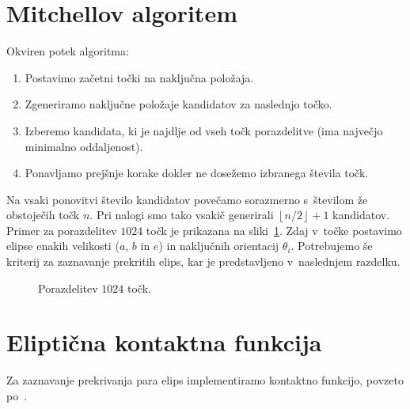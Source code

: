 \section{Mitchellov algoritem}
Okviren potek algoritma:
\begin{enumerate}
    \item Postavimo začetni točki na naključna položaja.
    \item Zgeneriramo naključne položaje kandidatov za naslednjo točko.
    \item Izberemo kandidata, ki je najdlje od vseh točk porazdelitve 
    (ima največjo minimalno oddaljenost).
    \item Ponavljamo prejšnje korake dokler ne dosežemo izbranega števila točk.
\end{enumerate}
Na vsaki ponovitvi število kandidatov povečamo sorazmerno s~številom že 
obstoječih točk $n$. Pri nalogi smo tako vsakič generirali 
$ \left \lfloor{n/2}\right \rfloor + 1$ kandidatov.\\
Primer za porazdelitev $1024$ točk je prikazana na sliki~\ref{fig:porazdelitev_tock}.
Zdaj v~točke postavimo elipse enakih velikosti ($a$, $b$ in $e$) in naključnih
orientacij $\theta_i$. Potrebujemo še kriterij za zaznavanje prekritih elips,
kar je predstavljeno v~naslednjem razdelku.
\begin{figure}[!ht]
    \centering
    \resizebox{.7\textwidth}{!}{}
    \caption[Blue noise]{Porazdelitev $1024$ točk.}
    \label{fig:porazdelitev_tock}
\end{figure}

\section{Eliptična kontaktna funkcija}
Za zaznavanje prekrivanja para elips implementiramo kontaktno funkcijo, povzeto
po~\cite{perram1985}.

